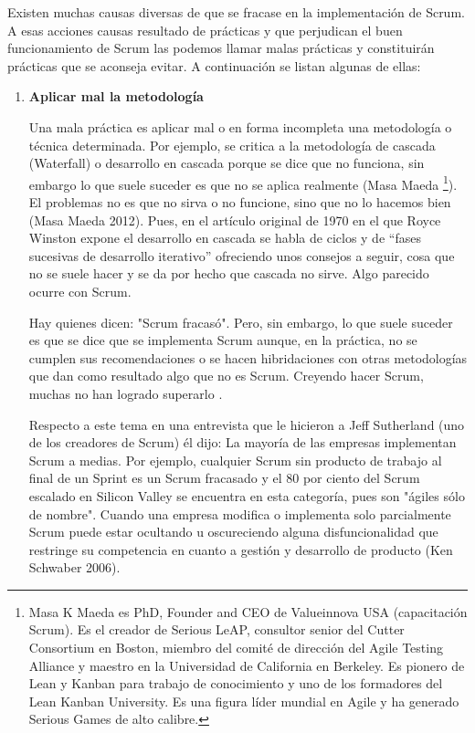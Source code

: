 Existen muchas causas diversas de que se fracase en la implementación de Scrum. A esas acciones causas resultado de prácticas y que perjudican el buen funcionamiento de Scrum las podemos llamar malas prácticas y constituirán prácticas que se aconseja evitar.
A continuación se listan algunas de ellas:

\begin{enumerate}

\item \textbf{Aplicar mal la metodología}

Una mala práctica es aplicar mal o en forma incompleta una metodología o técnica determinada. Por ejemplo, se critica a la metodología de cascada (Waterfall) o desarrollo en cascada porque se dice que no funciona, sin embargo lo que suele suceder es que no se aplica realmente (Masa Maeda \footnote{Masa K Maeda es PhD, Founder and CEO de Valueinnova USA (capacitación Scrum). Es el creador de Serious LeAP, consultor senior del Cutter Consortium en Boston, miembro del comité de dirección del Agile Testing Alliance y maestro en la Universidad de California en Berkeley. Es pionero de Lean y Kanban para trabajo de conocimiento y uno de los formadores del Lean Kanban University. Es una figura líder mundial en Agile y ha generado Serious Games de alto calibre.}). El problemas no es que no sirva o no funcione, sino que no lo hacemos bien (Masa Maeda  2012). Pues, en el artículo original de 1970 en el que Royce Winston expone el desarrollo en cascada se habla de ciclos y de “fases sucesivas de desarrollo iterativo” \cite{Winston-Royce-1970} ofreciendo unos consejos a seguir, cosa que no se suele hacer y se da por hecho que cascada no sirve. Algo parecido ocurre con Scrum.

Hay quienes dicen:  "Scrum fracasó". Pero, sin embargo, lo que suele suceder es que se dice que se implementa Scrum aunque, en la práctica, no se cumplen sus recomendaciones o se hacen hibridaciones con otras metodologías que dan como resultado algo que no es Scrum. Creyendo hacer Scrum, muchas no han logrado superarlo \cite{Gantthead-James-2010}.  

Respecto a este tema en una entrevista que le hicieron a Jeff Sutherland (uno de los creadores de Scrum) él dijo: La mayoría de las empresas implementan Scrum a medias. Por ejemplo, cualquier Scrum sin producto de trabajo al final de un Sprint es un Scrum fracasado y el 80 por ciento del Scrum escalado en Silicon Valley se encuentra en esta categoría, pues son "ágiles sólo de nombre". Cuando una empresa modifica o implementa solo parcialmente Scrum puede estar ocultando u oscureciendo alguna disfuncionalidad que restringe su competencia en cuanto a gestión y desarrollo de producto (Ken Schwaber 2006).



\end{enumerate}
